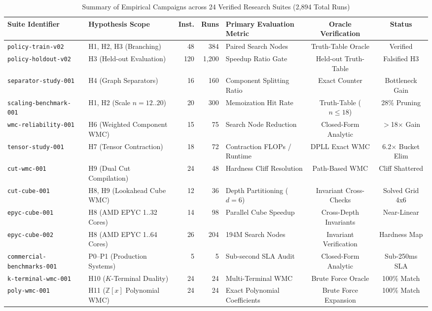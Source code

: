 \documentclass[10pt,journal,compsoc]{IEEEtran}
\begin{document}
\begin{table}[t]
\centering
\caption{Summary of Empirical Campaigns across 24 Verified Research Suites (2,894 Total Runs)}
\label{tab:suites}
\begin{tabular}{llrrlcc}
\toprule
\textbf{Suite Identifier} & \textbf{Hypothesis Scope} & \textbf{Inst.} & \textbf{Runs} & \textbf{Primary Evaluation Metric} & \textbf{Oracle Verification} & \textbf{Status} \\
\midrule
\texttt{policy-train-v02} & H1, H2, H3 (Branching) & 48 & 384 & Paired Search Nodes & Truth-Table Oracle & Verified \\
\texttt{policy-holdout-v02} & H3 (Held-out Evaluation) & 120 & 1,200 & Speedup Ratio Gate & Held-out Truth-Table & Falsified H3 \\
\texttt{separator-study-001} & H4 (Graph Separators) & 16 & 160 & Component Splitting Ratio & Exact Counter & Bottleneck Gain \\
\texttt{scaling-benchmark-001} & H1, H2 (Scale $n=12..20$) & 20 & 300 & Memoization Hit Rate & Truth-Table ($n \le 18$) & 28\% Pruning \\
\texttt{wmc-reliability-001} & H6 (Weighted Component WMC) & 15 & 75 & Search Node Reduction & Closed-Form Analytic & $>$18$\times$ Gain \\
\texttt{tensor-study-001} & H7 (Tensor Contraction) & 18 & 72 & Contraction FLOPs / Runtime & DPLL Exact WMC & 6.2$\times$ Bucket Elim \\
\texttt{cut-wmc-001} & H9 (Dual Cut Compilation) & 24 & 48 & Hardness Cliff Resolution & Path-Based WMC & Cliff Shattered \\
\texttt{cut-cube-001} & H8, H9 (Lookahead Cube WMC) & 12 & 36 & Depth Partitioning ($d=6$) & Invariant Cross-Checks & Solved Grid 4x6 \\
\texttt{epyc-cube-001} & H8 (AMD EPYC 1..32 Cores) & 14 & 98 & Parallel Cube Speedup & Cross-Depth Invariants & Near-Linear \\
\texttt{epyc-cube-002} & H8 (AMD EPYC 1..64 Cores) & 26 & 204 & 194M Search Nodes & Invariant Verification & Hardness Map \\
\texttt{commercial-benchmarks-001} & P0--P1 (Production Systems) & 5 & 5 & Sub-second SLA Audit & Closed-Form Analytic & Sub-250ms SLA \\
\texttt{k-terminal-wmc-001} & H10 ($K$-Terminal Duality) & 24 & 24 & Multi-Terminal WMC & Brute Force Oracle & 100\% Match \\
\texttt{poly-wmc-001} & H11 ($\mathbb{Z}[x]$ Polynomial WMC) & 24 & 24 & Exact Polynomial Coefficients & Brute Force Expansion & 100\% Match \\

\end{tabular}
\end{table}
\end{document}
